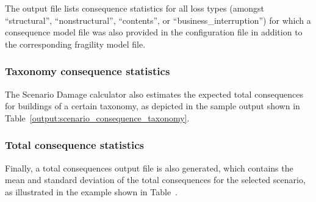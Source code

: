 

The output file lists consequence statistics for all loss types (amongst
``structural'', ``nonstructural'', ``contents'', or
``business\_interruption'') for which a consequence model file was also
provided in the configuration file in addition to the corresponding
\gls{fragility model} file.


\subsubsection{Taxonomy consequence statistics}
\label{subsubsec:scenario_taxonomy_consequence_statistics}

The Scenario Damage calculator also estimates the expected total consequences
for buildings of a certain \gls{taxonomy}, as depicted in the sample output
shown in Table~\ref{output:scenario_consequence_taxonomy}.




\subsubsection{Total consequence statistics}
\label{subsubsec:scenario_total_consequence_statistics}

Finally, a total consequences output file is also generated, which contains
the mean and standard deviation of the total consequences for the selected
scenario, as illustrated in the example shown in
Table~\label{output:scenario_consequence_total}.

